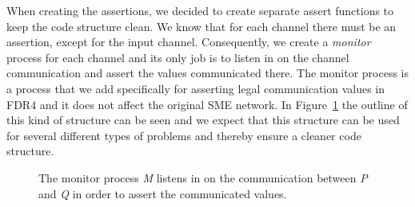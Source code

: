 When creating the assertions, we decided to create separate assert functions to keep the code structure clean. We know that for each \cspm{} channel there must be an assertion, except for the input channel.
Consequently, we create a \textit{monitor} process for each channel and its only job is to listen in on the channel communication and assert the values communicated there. The monitor process is a process that we add specifically for asserting legal communication values in FDR4 and it does not affect the original SME network.
In Figure~\ref{fig:assertion_process} the outline of this kind of structure can be seen and we expect that this structure can be used for several different types of problems and thereby ensure a cleaner code structure.


\begin{figure}[!ht]
  \centering
  \caption{The monitor process \textit{M} listens in on the communication between \textit{P} and \textit{Q} in order to assert the communicated values.}
  \label{fig:assertion_process}
\end{figure}


